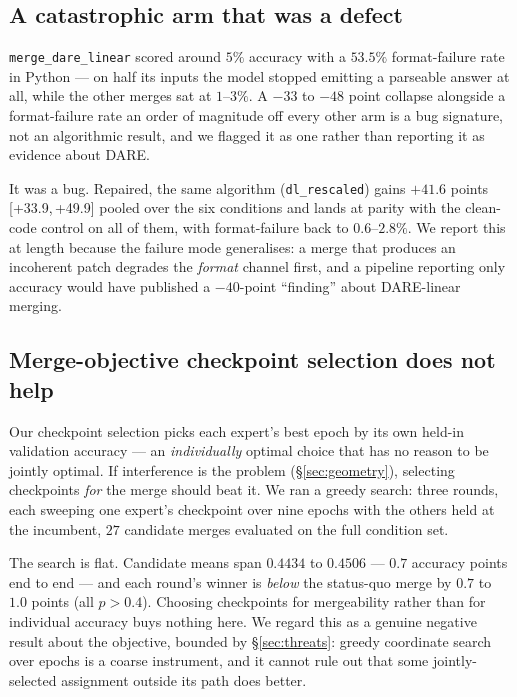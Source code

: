 \documentclass[sigconf,review,anonymous]{acmart}
\newcommand{\arm}[1]{\texttt{#1}}
\newcommand{\ci}[2]{{\small[#1,\,#2]}}
\begin{document}
\subsection{A catastrophic arm that was a defect}

\arm{merge\_dare\_linear} scored around $5\%$ accuracy with a $53.5\%$ format-failure rate in
Python --- on half its inputs the model stopped emitting a parseable answer at all, while the
other merges sat at $1$--$3\%$. A $-33$ to $-48$ point collapse alongside a format-failure rate
an order of magnitude off every other arm is a bug signature, not an algorithmic result, and we
flagged it as one rather than reporting it as evidence about DARE.

It was a bug. Repaired, the same algorithm (\arm{dl\_rescaled}) gains $+41.6$ points
\ci{+33.9}{+49.9} pooled over the six conditions and lands at parity with the clean-code
control on all of them, with format-failure back to $0.6$--$2.8\%$. We report this at length
because the failure mode generalises: a merge that produces an incoherent patch degrades the
\emph{format} channel first, and a pipeline reporting only accuracy would have published a
$-40$-point ``finding'' about DARE-linear merging.

\subsection{Merge-objective checkpoint selection does not help}
\label{sec:mergeoptimal}

Our checkpoint selection picks each expert's best epoch by its own held-in validation accuracy
--- an \emph{individually} optimal choice that has no reason to be jointly optimal. If
interference is the problem (\S\ref{sec:geometry}), selecting checkpoints \emph{for} the merge
should beat it. We ran a greedy search: three rounds, each sweeping one expert's checkpoint over
nine epochs with the others held at the incumbent, $27$ candidate merges evaluated on the full
condition set.

The search is flat. Candidate means span $0.4434$ to $0.4506$ --- $0.7$ accuracy points end to
end --- and each round's winner is \emph{below} the status-quo merge by $0.7$ to $1.0$ points
(all $p>0.4$). Choosing checkpoints for mergeability rather than for individual accuracy buys
nothing here. We regard this as a genuine negative result about the objective, bounded by
\S\ref{sec:threats}: greedy coordinate search over epochs is a coarse instrument, and it cannot
rule out that some jointly-selected assignment outside its path does better.
\end{document}
